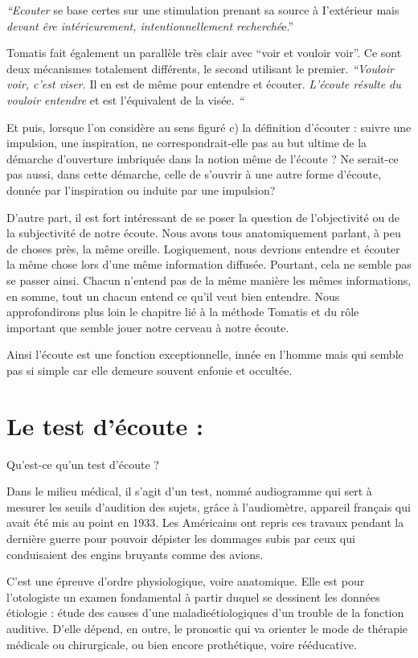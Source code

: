 \documentclass[12pt,french]{report}
\makeatletter
\let\SF@@footnote\footnote
\def\footnote{\ifx\protect\@typeset@protect
    \expandafter\SF@@footnote
  \else
    \expandafter\SF@gobble@opt
  \fi
}
\edef\SF@gobble@opt{\noexpand\protect
  \expandafter\noexpand\csname SF@gobble@opt \endcsname}
\makeatother
\begin{document}
\emph{``Ecouter} se base certes sur une stimulation prenant sa source
à I'extérieur mais \emph{devant êre intérieurement, intentionnellement
recherché}e.'' 

Tomatis fait également un parallèle très clair avec ``voir et vouloir
voir''. Ce sont deux mécanismes totalement différents, le second
utilisant le premier. \emph{``Vouloir voir, c'est viser. }Il en est
de même pour entendre et écouter.\emph{ L\textquoteright écoute résulte
du vouloir entendre }et est l\textquoteright équivalent de la visée.\emph{
``}

Et puis, lorsque l'on considère au sens figuré c) la définition d'écouter
: suivre une impulsion, une inspiration, ne correspondrait-elle pas
au but ultime de la démarche d'ouverture imbriquée dans la notion
même de l'écoute ? Ne serait-ce pas aussi, dans cette démarche, celle
de s'ouvrir à une autre forme d'écoute, donnée par l'inspiration ou
induite par une impulsion? 

D'autre part, il est fort intéressant de se poser la question de l'objectivité
ou de la subjectivité de notre écoute. Nous avons tous anatomiquement
parlant, à peu de choses près, la même oreille. Logiquement, nous
devrions entendre et écouter la même chose lors d'une même information
diffusée. Pourtant, cela ne semble pas se passer ainsi. Chacun n'entend
pas de la même manière les mêmes informations, en somme, tout un chacun
entend ce qu'il veut bien entendre. Nous approfondirons plus loin
le chapitre lié à la méthode Tomatis et du rôle important que semble
jouer notre cerveau à notre écoute. 

Ainsi l'écoute est une fonction exceptionnelle, innée en l'homme mais
qui semble pas si simple car elle demeure souvent enfouie et occultée.

\section{Le test d'écoute :}

Qu'est-ce qu'un test d'écoute ?

Dans le milieu médical, il s'agit d'un test, nommé audiogramme qui
sert à mesurer les seuils d'audition des sujets, grâce à l'audiomètre,
appareil français qui avait été mis au point en 1933. Les Américains
ont repris ces travaux pendant la dernière guerre pour pouvoir dépister
les dommages subis par ceux qui conduisaient des engins bruyants comme
des avions.

C'est une épreuve d'ordre physiologique, voire anatomique.\emph{ }Elle
est pour l\textquoteright otologiste
un examen fondamental à partir duquel se dessinent les données \footnote{étiologie : étude des causes d'une maladie}étiologiques
d'un trouble de la fonction auditive. D'elle dépend, en outre, le
pronostic qui va orienter le mode de thérapie médicale ou chirurgicale,
ou bien encore prothétique, voire rééducative. 
\end{document}
